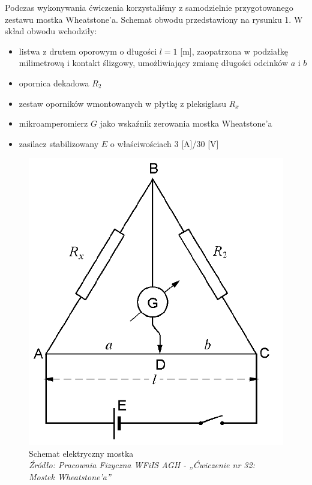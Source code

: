 \documentclass[a4paper,12pts]{article}
\begin{document}
	Podczas wykonywania ćwiczenia korzystaliśmy z samodzielnie przygotowanego zestawu mostka Wheatstone'a. Schemat obwodu przedstawiony na rysunku 1. W skład obwodu wchodziły:
	
	\begin{itemize}
		\item listwa z drutem oporowym o długości $l = 1$ [m], zaopatrzona w podziałkę milimetrową i kontakt ślizgowy, umożliwiający zmianę długości odcinków $a$ i $b$
		\item opornica dekadowa $R_{2}$
		\item zestaw oporników wmontowanych w płytkę z pleksiglasu $R_{x}$
		\item mikroamperomierz $G$ jako wskaźnik zerowania mostka Wheatstone'a
		\item zasilacz stabilizowany $E$ o właściwościach 3 [A]/30 [V]
	\end{itemize}
	
	\begin{figure}[!h]
		\centering
		\includegraphics[scale=0.2]{schemat}
		\caption{Schemat elektryczny mostka \\ \textit{Źródło: Pracownia Fizyczna WFiIS AGH - „Ćwiczenie nr 32: Mostek Wheatstone'a”} }
		\label{schematUkladu}
	\end{figure}
	
\end{document}
